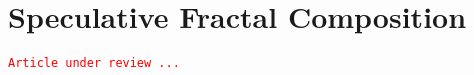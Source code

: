 \newpage


\label{fracdoc}

%



\chapter*{Speculative Fractal Composition}

\texttt{\textcolor{red}{\small Article under review ...}}
